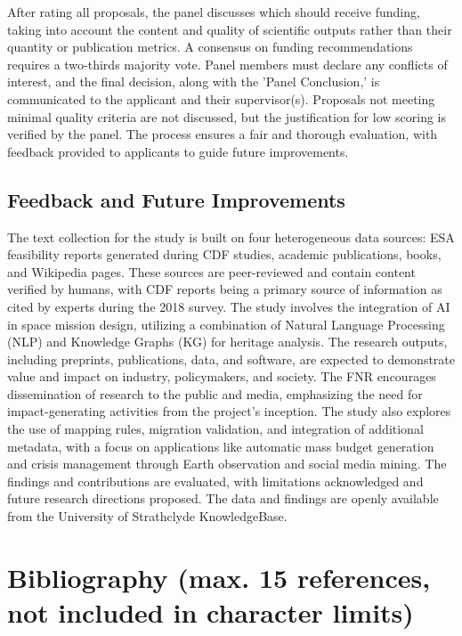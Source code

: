 \documentclass{article}
\begin{document}
After rating all proposals, the panel discusses which should receive funding, taking into account the content and quality of scientific outputs rather than their quantity or publication metrics. A consensus on funding recommendations requires a two-thirds majority vote. Panel members must declare any conflicts of interest, and the final decision, along with the 'Panel Conclusion,' is communicated to the applicant and their supervisor(s). Proposals not meeting minimal quality criteria are not discussed, but the justification for low scoring is verified by the panel. The process ensures a fair and thorough evaluation, with feedback provided to applicants to guide future improvements.

\subsection{Feedback and Future Improvements}

The text collection for the study is built on four heterogeneous data sources: ESA feasibility reports generated during CDF studies, academic publications, books, and Wikipedia pages. These sources are peer-reviewed and contain content verified by humans, with CDF reports being a primary source of information as cited by experts during the 2018 survey. The study involves the integration of AI in space mission design, utilizing a combination of Natural Language Processing (NLP) and Knowledge Graphs (KG) for heritage analysis. The research outputs, including preprints, publications, data, and software, are expected to demonstrate value and impact on industry, policymakers, and society. The FNR encourages dissemination of research to the public and media, emphasizing the need for impact-generating activities from the project's inception. The study also explores the use of mapping rules, migration validation, and integration of additional metadata, with a focus on applications like automatic mass budget generation and crisis management through Earth observation and social media mining. The findings and contributions are evaluated, with limitations acknowledged and future research directions proposed. The data and findings are openly available from the University of Strathclyde KnowledgeBase.

\section{Bibliography (max. 15 references, not included in character limits)}
\end{document}
